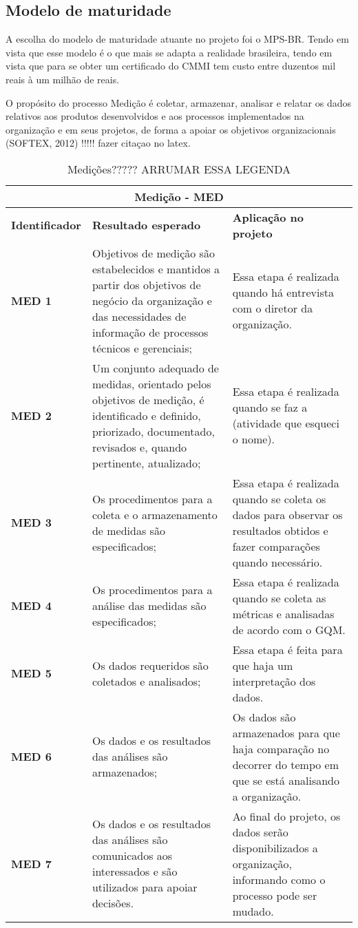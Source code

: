 \subsection{Modelo de maturidade}

  A escolha do modelo de maturidade atuante no projeto foi o MPS-BR. Tendo em vista que esse modelo é o que mais se adapta a realidade brasileira, tendo em vista que para se obter um certificado do CMMI  tem custo entre duzentos mil reais à um milhão de reais.

  O propósito do processo Medição é coletar, armazenar, analisar e relatar os dados relativos aos produtos desenvolvidos e aos processos implementados na organização e em seus projetos, de forma a apoiar os objetivos organizacionais (SOFTEX, 2012) !!!!! fazer citaçao no latex.

  \begin{table}[]
  \centering
  \begin{tabular}{|l|l|l|}
  \hline
    \multicolumn{3}{|c|}{\textbf{Medição - MED}} \\ \hline
    \textbf{Identificador} & \textbf{Resultado esperado} & \textbf{Aplicação no projeto} \\ \hline
    \textbf{MED 1} & Objetivos de medição são estabelecidos e mantidos a partir dos objetivos de negócio da organização e das necessidades de informação de processos técnicos e gerenciais; & Essa etapa é realizada quando há entrevista com o diretor da organização. \\ \hline
    \textbf{MED 2} & Um conjunto adequado de medidas, orientado pelos objetivos de medição, é identificado e definido, priorizado, documentado, revisados e, quando pertinente, atualizado; & Essa etapa é realizada quando se faz a (atividade que esqueci o nome). \\ \hline
    \textbf{MED 3} & Os procedimentos para a coleta e o armazenamento de medidas são especificados; & Essa etapa é realizada quando se coleta os dados para observar os resultados obtidos e fazer comparações quando necessário. \\ \hline
    \textbf{MED 4} & Os procedimentos para a análise das medidas são especificados; & Essa etapa é realizada quando se coleta as métricas e analisadas de acordo com o GQM. \\ \hline
    \textbf{MED 5} & Os dados requeridos são coletados e analisados; & Essa etapa é feita para que haja um interpretação dos dados. \\ \hline
    \textbf{MED 6} & Os dados e os resultados das análises são armazenados; & Os dados são armazenados para que haja comparação no decorrer do tempo em que se está analisando a organização. \\ \hline
    \textbf{MED 7} & Os dados e os resultados das análises são comunicados aos interessados e são utilizados para apoiar decisões. & Ao final do projeto, os dados serão disponibilizados a organização, informando como o processo pode ser mudado. \\ \hline
  \end{tabular}
  \caption{Medições????? ARRUMAR ESSA LEGENDA}
  \label{tab:medicoes}
  \end{table}
